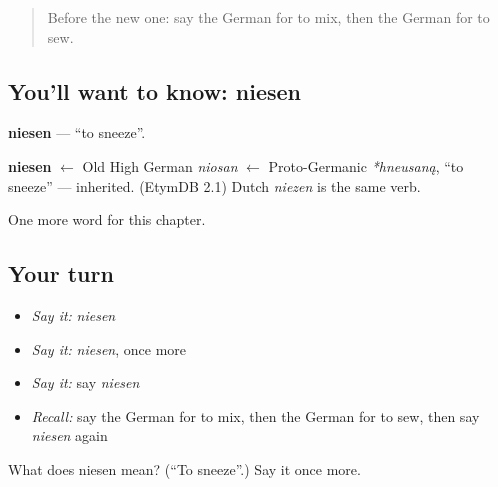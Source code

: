 \begin{quote}
Before the new one: say the German for to mix, then the German for to sew.
\end{quote}

\subsection*{You'll want to know: niesen}
\textbf{niesen} — \textquotedblleft{}to sneeze\textquotedblright{}.

\begin{cousinweb}
\textbf{niesen} $\leftarrow$ Old High German \emph{niosan} $\leftarrow$ Proto-Germanic \emph{*hneusaną}, \textquotedblleft{}to sneeze\textquotedblright{} — inherited. (EtymDB 2.1) Dutch \emph{niezen} is the same verb.
\end{cousinweb}

\begin{grammarlens}[title={What you've built}]
One more word for this chapter.
\end{grammarlens}

\subsection*{Your turn}
\begin{itemize}
\raggedright
  \item \emph{Say it:} \emph{niesen}
  \item \emph{Say it:} \emph{niesen}, once more
  \item \emph{Say it:} say \emph{niesen}
  \item \emph{Recall:} say the German for to mix, then the German for to sew, then say \emph{niesen} again
\end{itemize}

\begin{tcolorbox}[breakable,colback=teal!4,colframe=teal!35!black,title={Before you move on}]
What does niesen mean? (\textquotedblleft{}To sneeze\textquotedblright{}.) Say it once more.
\end{tcolorbox}
